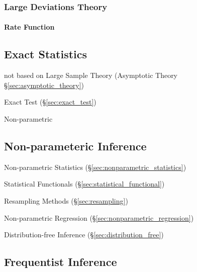 \subsubsection{Large Deviations Theory}\label{sec:large_deviations_theory}

\paragraph{Rate Function}\label{sec:rate_function}\hfill



\subsection{Exact Statistics}\label{sec:exact_statistics}

not based on Large Sample Theory (Asymptotic Theory
\S\ref{sec:asymptotic_theory})

\fist Exact Test (\S\ref{sec:exact_test})

Non-parametric



\subsection{Non-parameteric Inference}\label{sec:nonparametric_inference}

\fist Non-parametric Statistics (\S\ref{sec:nonparametric_statistics})

Statistical Functionals (\S\ref{sec:statistical_functional})

Resampling Methods (\S\ref{sec:resampling})

Non-parametric Regression (\S\ref{sec:nonparametric_regression})

Distribution-free Inference (\S\ref{sec:distribution_free})



\subsection{Frequentist Inference}\label{sec:frequentist_inference}

